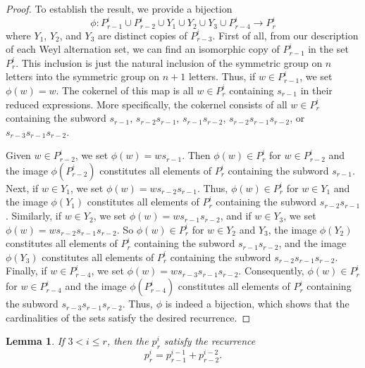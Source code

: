 \documentclass{amsart}
\newtheorem{lemma}[theorem]{Lemma}
\theoremstyle{definition}
\begin{document}
\begin{proof}
To establish the result, we provide a bijection \[\phi:P_{r-1}^i \cup P_{r-2}^i \cup Y_1 \cup Y_2 \cup Y_3 \cup P_{r-4}^i\to P_r^i\] where $Y_1$, $Y_2$, and $Y_3$ are distinct copies of $P_{r-3}^i$. 
First of all, from our description of each Weyl alternation set, 
we can find an isomorphic copy of $P_{r-1}^i$ in the 
set $P_{r}^i$. This inclusion is just the natural inclusion of the symmetric group on $n$ letters into the symmetric group on $n+1$ letters.
Thus, if $w \in P_{r-1}^i$, we set $\phi(w) = w$. 
The cokernel of this map is all $w \in P_r^i$ containing $s_{r-1}$ in their reduced expressions. 
More specifically, the cokernel consists of all $w \in P_r^i$ containing the subword $s_{r-1}$, $s_{r-2}s_{r-1}$, $s_{r-1}s_{r-2}$, $s_{r-2}s_{r-1}s_{r-2}$, or $s_{r-3}s_{r-1}s_{r-2}$. 

Given $w \in P_{r-2}^i$, we set $\phi(w) = w s_{r-1}$. Then $\phi(w) \in P_r^i$ for $w\in P_{r-2}^i$ and the image $\phi(P_{r-2}^i)$ constitutes all elements of $P_r^i$ containing the subword $s_{r-1}$. Next, if $w \in Y_1$, we set $\phi(w) = w s_{r-2}s_{r-1}$. Thus, $\phi(w) \in P_r^i$ for $w\in Y_1$ and the image $\phi(Y_1)$ constitutes all elements of $P_r^i$ containing the subword $s_{r-2}s_{r-1}$. Similarly, if $w \in Y_2$, we set $\phi(w) = w s_{r-1}s_{r-2}$, and if $w \in Y_3$, we set $\phi(w) = w s_{r-2}s_{r-1}s_{r-2}$. {So $\phi(w)\in P_r^i$ for $w\in Y_2$ and $Y_3$, the image $\phi(Y_2)$ constitutes all elements of $P_r^i$ containing the subword $s_{r-1}s_{r-2}$, and the image $\phi(Y_3)$ constitutes all elements of $P_r^i$ containing the subword $s_{r-2}s_{r-1}s_{r-2}$.} Finally, if $w \in P_{r-4}^i$, we set $\phi(w) = w s_{r-3}s_{r-1}s_{r-2}$. {Consequently, $\phi(w)\in P_r^i$ for $w\in P_{r-4}^i$ and the image $\phi(P_{r-4}^i)$ constitutes all elements of $P_r^i$ containing the subword $s_{r-3}s_{r-1}s_{r-2}$.} Thus, $\phi$ is indeed a bijection, which shows that the cardinalities of the sets satisfy the desired recurrence. 
\end{proof}


\begin{lemma}\label{lem:p_diag_recurrence}
If $3<i\leq r$, then 
the $p_r^i$ satisfy the recurrence  
\[
p_r^i = p_{r-1}^{i-1}+p_{r-2}^{i-2}.
\]
\end{lemma}
\end{document}
